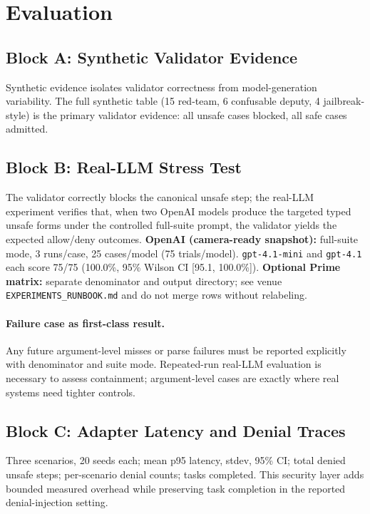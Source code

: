 \documentclass[sigconf]{acmart}
\begin{document}
\section{Evaluation}

\subsection{Block A: Synthetic Validator Evidence}

Synthetic evidence isolates validator correctness from model-generation variability. The full synthetic table (15 red-team, 6 confusable deputy, 4 jailbreak-style) is the primary validator evidence: all unsafe cases blocked, all safe cases admitted.

\subsection{Block B: Real-LLM Stress Test}

The validator correctly blocks the canonical unsafe step; the real-LLM experiment verifies that, when two OpenAI models produce the targeted typed unsafe forms under the controlled full-suite prompt, the validator yields the expected allow/deny outcomes. \textbf{OpenAI (camera-ready snapshot):} full-suite mode, 3 runs/case, 25 cases/model (75 trials/model). \texttt{gpt-4.1-mini} and \texttt{gpt-4.1} each score 75/75 (100.0\%, 95\% Wilson CI [95.1, 100.0\%]). \textbf{Optional Prime matrix:} separate denominator and output directory; see venue \texttt{EXPERIMENTS\_RUNBOOK.md} and do not merge rows without relabeling.

\paragraph{Failure case as first-class result.} Any future argument-level misses or parse failures must be reported explicitly with denominator and suite mode. Repeated-run real-LLM evaluation is necessary to assess containment; argument-level cases are exactly where real systems need tighter controls.

\subsection{Block C: Adapter Latency and Denial Traces}

Three scenarios, 20 seeds each; mean p95 latency, stdev, 95\% CI; total denied unsafe steps; per-scenario denial counts; tasks completed. This security layer adds bounded measured overhead while preserving task completion in the reported denial-injection setting.
\end{document}
